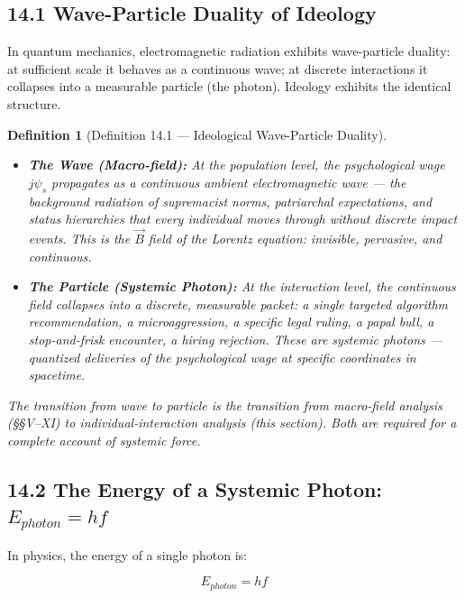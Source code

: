 \documentclass[12pt]{book}
\numberwithin{equation}{chapter}
\newtheorem{definition}{Definition}[chapter]
\begin{document}
\subsection{14.1 Wave-Particle Duality of Ideology}

    In quantum mechanics, electromagnetic radiation exhibits wave-particle duality: at sufficient scale it behaves as a continuous wave; at discrete interactions it collapses into a measurable particle (the photon). Ideology exhibits the identical structure.
  

\begin{definition}[Definition 14.1 — Ideological Wave-Particle Duality]
\begin{itemize}

\item 
\textbf{The Wave (Macro-field):} At the population level, the psychological wage $j\psi_s$ propagates as a continuous ambient electromagnetic wave — the background radiation of supremacist norms, patriarchal expectations, and status hierarchies that every individual moves through without discrete impact events. This is the $\vec{B}$ field of the Lorentz equation: invisible, pervasive, and continuous.
      

\item 
\textbf{The Particle (Systemic Photon):} At the interaction level, the continuous field collapses into a discrete, measurable packet: a single targeted algorithm recommendation, a microaggression, a specific legal ruling, a papal bull, a stop-and-frisk encounter, a hiring rejection. These are systemic photons — quantized deliveries of the psychological wage at specific coordinates in spacetime.
      

\end{itemize}

    The transition from wave to particle is the transition from macro-field analysis (§§V–XI) to individual-interaction analysis (this section). Both are required for a complete account of systemic force.
  \end{definition}

\subsection{14.2 The Energy of a Systemic Photon: $E_{photon} = hf$}

    In physics, the energy of a single photon is:
  

\begin{equation}
      \boxed{E_{photon} = hf}
\label{eq:uef-photon-energy}
\end{equation}
\end{document}
